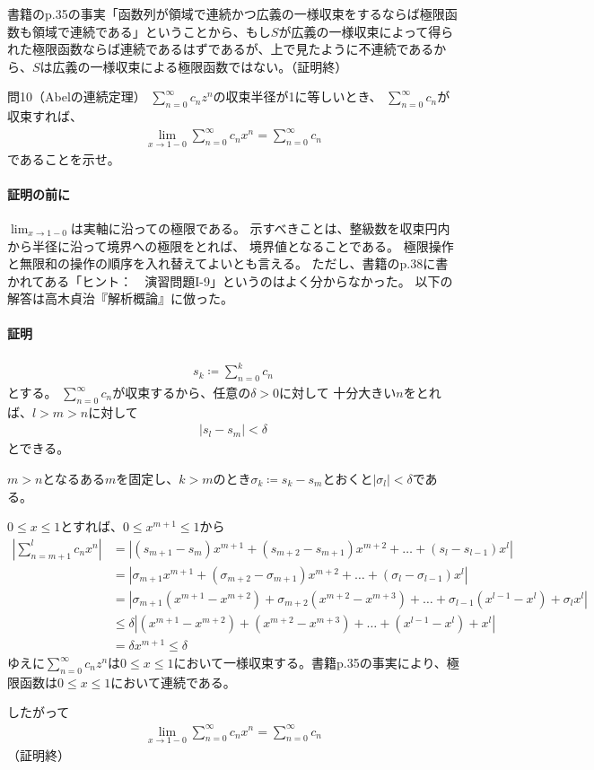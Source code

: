 書籍のp.35の事実「函数列が領域で連続かつ広義の一様収束をするならば極限函数も領域で連続である」ということから、もし$S$が広義の一様収束によって得られた極限函数ならば連続であるはずであるが、上で見たように不連続であるから、$S$は広義の一様収束による極限函数ではない。（証明終）

\begin{mysimplebox}{問10（Abelの連続定理）}
    $\sum_{n=0}^{\infty}c_nz^n$の収束半径が1に等しいとき、
    $\sum_{n=0}^{\infty}c_n$が収束すれば、
    \begin{align*}
        \lim_{x\to 1-0}\sum_{n=0}^{\infty}c_nx^n=\sum_{n=0}^{\infty}c_n
    \end{align*}
    であることを示せ。
\end{mysimplebox}
\paragraph{証明の前に}
$\lim_{x\to 1-0}$は実軸に沿っての極限である。
示すべきことは、整級数を収束円内から半径に沿って境界への極限をとれば、
境界値となることである。
極限操作と無限和の操作の順序を入れ替えてよいとも言える。
ただし、書籍のp.38に書かれてある「ヒント：　演習問題I-9」というのはよく分からなかった。
以下の解答は高木貞治『解析概論』に倣った。

\paragraph{証明}
\begin{align*}
    s_k\coloneqq\sum_{n=0}^{k}c_n
\end{align*}
とする。
$\sum_{n=0}^{\infty}c_n$が収束するから、任意の$\delta>0$に対して
十分大きい$n$をとれば、$l>m>n$に対して
\begin{align*}
    |s_l-s_m|<\delta
\end{align*}
とできる。

$m>n$となるある$m$を固定し、$k>m$のとき$\sigma_k\coloneqq s_k-s_m$とおくと$|\sigma_l|<\delta$である。

$0\le x\le 1$とすれば、$0\le x^{m+1}\le 1$から
\begin{align*}
    \left|\sum_{n=m+1}^{l}c_nx^n\right|
    &=\left|(s_{m+1}-s_m)x^{m+1}+(s_{m+2}-s_{m+1})x^{m+2}+\dots+(s_l-s_{l-1})x^l\right|\\
    &=\left|\sigma_{m+1}x^{m+1}+(\sigma_{m+2}-\sigma_{m+1})x^{m+2}+\dots+(\sigma_l-\sigma_{l-1})x^l\right|\\
    &=\left|\sigma_{m+1}(x^{m+1}-x^{m+2})+\sigma_{m+2}(x^{m+2}-x^{m+3})+\dots+\sigma_{l-1}(x^{l-1}-x^l)+\sigma_lx^l\right|\\
    &\le\delta\left|(x^{m+1}-x^{m+2})+(x^{m+2}-x^{m+3})+\dots+(x^{l-1}-x^l)+x^l\right|\\
    &=\delta x^{m+1}\le\delta
\end{align*}
ゆえに$\sum_{n=0}^{\infty}c_nz^n$は$0\le x\le 1$において一様収束する。書籍p.35の事実により、極限函数は$0\le x\le 1$において連続である。

したがって
\begin{align*}
    \lim_{x\to 1-0}\sum_{n=0}^{\infty}c_nx^n=\sum_{n=0}^{\infty}c_n
\end{align*}
（証明終）